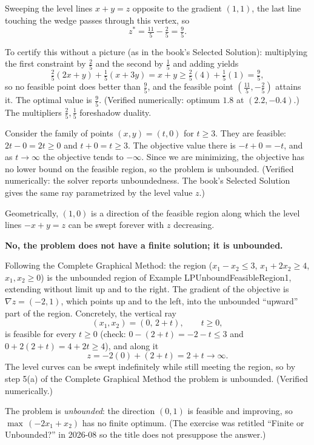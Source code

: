 Sweeping the level lines $x + y = z$ opposite to the gradient $(1,1)$, the last line touching the wedge passes through this vertex, so
\[
z^* = \tfrac{11}{5} - \tfrac{2}{5} = \tfrac{9}{5}.
\]

To certify this without a picture (as in the book's Selected Solution): multiplying the first constraint by $\tfrac{2}{5}$ and the second by $\tfrac{1}{5}$ and adding yields
\[
\tfrac{2}{5}(2x + y) + \tfrac{1}{5}(x + 3y) = x + y \geq \tfrac{2}{5}(4) + \tfrac{1}{5}(1) = \tfrac{9}{5},
\]
so no feasible point does better than $\tfrac{9}{5}$, and the feasible point $(\tfrac{11}{5}, -\tfrac{2}{5})$ attains it. The optimal value is $\tfrac{9}{5}$. (Verified numerically: optimum $1.8$ at $(2.2, -0.4)$.) The multipliers $\tfrac25, \tfrac15$ foreshadow duality.

Consider the family of points $(x, y) = (t, 0)$ for $t \geq 3$. They are feasible: $2t - 0 = 2t \geq 0$ and $t + 0 = t \geq 3$. The objective value there is $-t + 0 = -t$, and as $t \to \infty$ the objective tends to $-\infty$. Since we are minimizing, the objective has no lower bound on the feasible region, so the problem is unbounded. (Verified numerically: the solver reports unboundedness. The book's Selected Solution gives the same ray parametrized by the level value $z$.)

Geometrically, $(1,0)$ is a direction of the feasible region along which the level lines $-x + y = z$ can be swept forever with $z$ decreasing.

\textbf{No, the problem does not have a finite solution; it is unbounded.}

Following the Complete Graphical Method: the region ($x_1 - x_2 \leq 3$, $x_1 + 2x_2 \geq 4$, $x_1, x_2 \geq 0$) is the unbounded region of Example LPUnboundFeasibleRegion1, extending without limit up and to the right. The gradient of the objective is $\nabla z = (-2, 1)$, which points up and to the left, into the unbounded ``upward'' part of the region. Concretely, the vertical ray
\[
(x_1, x_2) = (0,\, 2 + t), \qquad t \geq 0,
\]
is feasible for every $t \geq 0$ (check: $0 - (2+t) = -2 - t \leq 3$ and $0 + 2(2+t) = 4 + 2t \geq 4$), and along it
\[
z = -2(0) + (2 + t) = 2 + t \longrightarrow \infty.
\]
The level curves can be swept indefinitely while still meeting the region, so by step 5(a) of the Complete Graphical Method the problem is unbounded. (Verified numerically.)

\begin{qaflag}
The problem is \emph{unbounded}: the direction $(0,1)$ is feasible and improving, so $\max\, (-2x_1 + x_2)$ has no finite optimum. (The exercise was retitled ``Finite or Unbounded?'' in 2026-08 so the title does not presuppose the answer.)
\end{qaflag}

